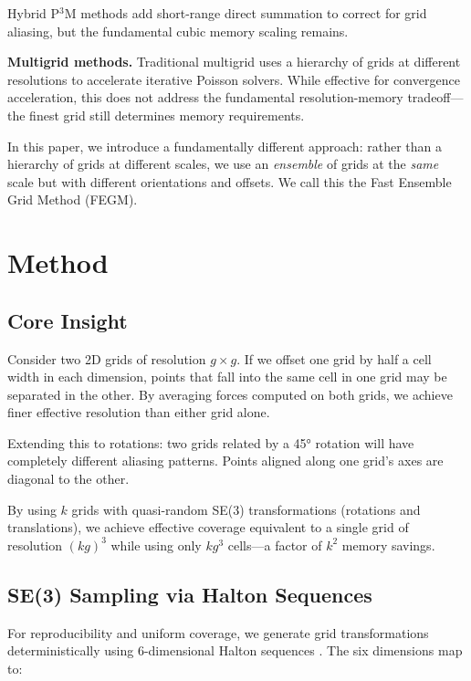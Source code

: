 \documentclass[11pt,twocolumn]{article}
\begin{document}
Hybrid P$^3$M methods \cite{hockney1988} add short-range direct summation to correct for grid aliasing, but the fundamental cubic memory scaling remains.

\textbf{Multigrid methods.} Traditional multigrid \cite{brandt1977} uses a hierarchy of grids at different resolutions to accelerate iterative Poisson solvers. While effective for convergence acceleration, this does not address the fundamental resolution-memory tradeoff---the finest grid still determines memory requirements.

In this paper, we introduce a fundamentally different approach: rather than a hierarchy of grids at different scales, we use an \emph{ensemble} of grids at the \emph{same} scale but with different orientations and offsets. We call this the Fast Ensemble Grid Method (FEGM).

\section{Method}

\subsection{Core Insight}

Consider two 2D grids of resolution $g \times g$. If we offset one grid by half a cell width in each dimension, points that fall into the same cell in one grid may be separated in the other. By averaging forces computed on both grids, we achieve finer effective resolution than either grid alone.

Extending this to rotations: two grids related by a 45° rotation will have completely different aliasing patterns. Points aligned along one grid's axes are diagonal to the other.

By using $k$ grids with quasi-random SE(3) transformations (rotations and translations), we achieve effective coverage equivalent to a single grid of resolution $(kg)^3$ while using only $kg^3$ cells---a factor of $k^2$ memory savings.

\subsection{SE(3) Sampling via Halton Sequences}

For reproducibility and uniform coverage, we generate grid transformations deterministically using 6-dimensional Halton sequences \cite{halton1964}. The six dimensions map to:
\end{document}
